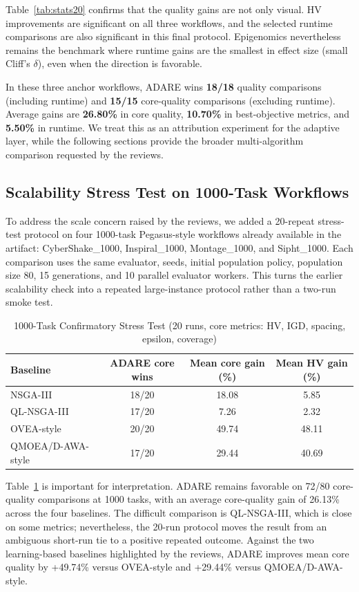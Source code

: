 \documentclass[runningheads]{llncs}
\begin{document}
Table~\ref{tab:stats20} confirms that the quality gains are not only visual. HV improvements are significant on all three workflows, and the selected runtime comparisons are also significant in this final protocol. Epigenomics nevertheless remains the benchmark where runtime gains are the smallest in effect size (small Cliff's $\delta$), even when the direction is favorable.

In these three anchor workflows, ADARE wins \textbf{18/18} quality comparisons (including runtime) and \textbf{15/15} core-quality comparisons (excluding runtime). Average gains are \textbf{26.80\%} in core quality, \textbf{10.70\%} in best-objective metrics, and \textbf{5.50\%} in runtime. We treat this as an attribution experiment for the adaptive layer, while the following sections provide the broader multi-algorithm comparison requested by the reviews.

\subsection{Scalability Stress Test on 1000-Task Workflows}
To address the scale concern raised by the reviews, we added a 20-repeat stress-test protocol on four 1000-task Pegasus-style workflows already available in the artifact: CyberShake\_1000, Inspiral\_1000, Montage\_1000, and Sipht\_1000. Each comparison uses the same evaluator, seeds, initial population policy, population size 80, 15 generations, and 10 parallel evaluator workers. This turns the earlier scalability check into a repeated large-instance protocol rather than a two-run smoke test.

\begin{table}[H]
\caption{1000-Task Confirmatory Stress Test (20 runs, core metrics: HV, IGD, spacing, epsilon, coverage)}
\label{tab:stress1000}
\centering
\scriptsize
\begin{tabular}{@{}lccc@{}}
\toprule
Baseline & ADARE core wins & Mean core gain (\%) & Mean HV gain (\%) \\
\midrule
NSGA-III & 18/20 & 18.08 & 5.85 \\
QL-NSGA-III & 17/20 & 7.26 & 2.32 \\
OVEA-style & 20/20 & 49.74 & 48.11 \\
QMOEA/D-AWA-style & 17/20 & 29.44 & 40.69 \\
\bottomrule
\end{tabular}
\end{table}

Table~\ref{tab:stress1000} is important for interpretation. ADARE remains favorable on 72/80 core-quality comparisons at 1000 tasks, with an average core-quality gain of 26.13\% across the four baselines. The difficult comparison is QL-NSGA-III, which is close on some metrics; nevertheless, the 20-run protocol moves the result from an ambiguous short-run tie to a positive repeated outcome. Against the two learning-based baselines highlighted by the reviews, ADARE improves mean core quality by +49.74\% versus OVEA-style and +29.44\% versus QMOEA/D-AWA-style.
\end{document}
